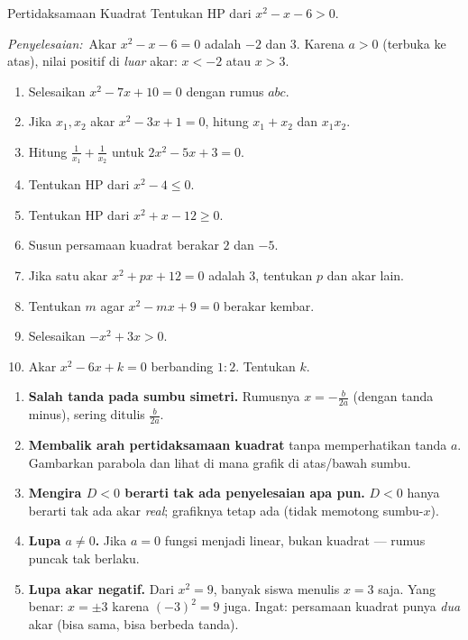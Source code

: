 \documentclass[11pt,a4paper]{report}
\theoremstyle{gaya}
\newcommand{\jawab}{\par\smallskip\noindent\textit{\textcolor{oranye}{Penyelesaian:}}\ }
\begin{document}
\begin{contoh}{Pertidaksamaan Kuadrat}
Tentukan HP dari $x^2-x-6>0$.

\jawab Akar $x^2-x-6=0$ adalah $-2$ dan $3$. Karena $a>0$ (terbuka ke atas), nilai positif di \emph{luar} akar: $x<-2$ atau $x>3$.
\end{contoh}

\begin{latihan}
\begin{enumerate}[leftmargin=*]
  \item Selesaikan $x^2-7x+10=0$ dengan rumus $abc$.
  \item Jika $x_1,x_2$ akar $x^2-3x+1=0$, hitung $x_1+x_2$ dan $x_1x_2$.
  \item Hitung $\tfrac1{x_1}+\tfrac1{x_2}$ untuk $2x^2-5x+3=0$.
  \item Tentukan HP dari $x^2-4\le0$.
  \item Tentukan HP dari $x^2+x-12\ge0$.
  \item Susun persamaan kuadrat berakar $2$ dan $-5$.
  \item Jika satu akar $x^2+px+12=0$ adalah $3$, tentukan $p$ dan akar lain.
  \item Tentukan $m$ agar $x^2-mx+9=0$ berakar kembar.
  \item Selesaikan $-x^2+3x>0$.
  \item Akar $x^2-6x+k=0$ berbanding $1:2$. Tentukan $k$.
\end{enumerate}
\end{latihan}

\begin{kesalahan}
\begin{enumerate}[leftmargin=*,topsep=2pt]
  \item \textbf{Salah tanda pada sumbu simetri.} Rumusnya $x=-\tfrac{b}{2a}$ (dengan tanda minus), sering ditulis $\tfrac{b}{2a}$.
  \item \textbf{Membalik arah pertidaksamaan kuadrat} tanpa memperhatikan tanda $a$. Gambarkan parabola dan lihat di mana grafik di atas/bawah sumbu.
  \item \textbf{Mengira $D<0$ berarti tak ada penyelesaian apa pun.} $D<0$ hanya berarti tak ada akar \emph{real}; grafiknya tetap ada (tidak memotong sumbu-$x$).
  \item \textbf{Lupa $a\neq0$.} Jika $a=0$ fungsi menjadi linear, bukan kuadrat --- rumus puncak tak berlaku.
  \item \textbf{Lupa akar negatif.} Dari $x^2=9$, banyak siswa menulis $x=3$ saja. Yang benar: $x=\pm3$ karena $(-3)^2=9$ juga. Ingat: persamaan kuadrat punya \emph{dua} akar (bisa sama, bisa berbeda tanda).
\end{enumerate}
\end{kesalahan}
\end{document}
